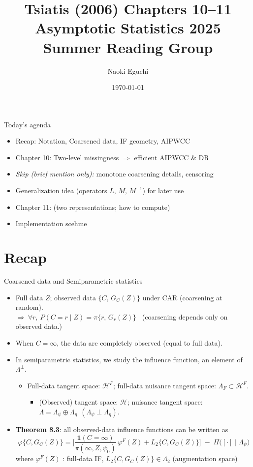 \documentclass[xcolor=dvipsnames,aspectratio=169]{beamer}
\title{Tsiatis (2006) Chapters 10--11\\ \small{Asymptotic Statistics 2025 Summer Reading Group}}
\author{Naoki Eguchi}
\institute{Faculty of Medicine, Kyoto University}
\date{\today}
\newcommand{\1}{\mathbbm{1}}
\begin{document}
\begin{frame}
  \titlepage
\end{frame}

\begin{frame}{Today's agenda}
  \begin{itemize}
    \item Recap: Notation, Coarsened data, IF geometry, AIPWCC
    \item Chapter 10: Two-level missingness $\Rightarrow$ efficient AIPWCC \& DR
    \item \emph{Skip (brief mention only):} monotone coarsening details, censoring
    \item Generalization idea (operators $L,\,M,\,M^{-1}$) for later use
    \item Chapter 11: (two representations; how to compute)
    \item Implementation scehme
  \end{itemize}
\end{frame}

\section{Recap}

\begin{frame}{Coarsened data and Semiparametric statistics}
  \begin{itemize}
    \item Full data $Z$; observed data $\{C,\,G_C(Z)\}$ under CAR (coarsening at random).\\
          $\Rightarrow\ \forall r,\ P(C=r\mid Z)=\pi\{r,\,G_r(Z)\}$ \ (coarsening depends only on observed data.)
    \item When $C=\infty$, the data are completely observed (equal to full data).
    \item In semiparametric statistics, we study the influence function, an element of $\Lambda^{\perp}$.
    \begin{itemize}
      \item Full-data tangent space: $\mathcal{H}^F$; full-data nuisance tangent space: $\Lambda_F \subset \mathcal{H}^F$.
      \begin{itemize}
        \item (Observed) tangent space: $\mathcal{H}$; nuisance tangent space:
              $\Lambda=\Lambda_{\psi}\oplus \Lambda_{\eta}\ \ (\Lambda_{\psi}\perp \Lambda_{\eta})$.
      \end{itemize}
    \end{itemize}
    \item \textbf{Theorem 8.3}: all observed-data influence functions can be written as
    \[
      \varphi \{C,G_C(Z)\}
      =
      \Biggl[
        \frac{\mathbf{1}(C=\infty)}{\pi(\infty,Z,\psi_0)}\,\varphi ^F(Z)
        + L_2\{C,G_C(Z)\}
      \Biggr]
      \;-\; \Pi\!\bigl([\cdot]\mid \Lambda_\psi\bigr)
    \]
    where $\varphi ^F(Z)$ : full-data IF, $L_2\{C,G_C(Z)\}\in \Lambda_2$ (augmentation space)
  \end{itemize}
\end{frame}
\end{document}

